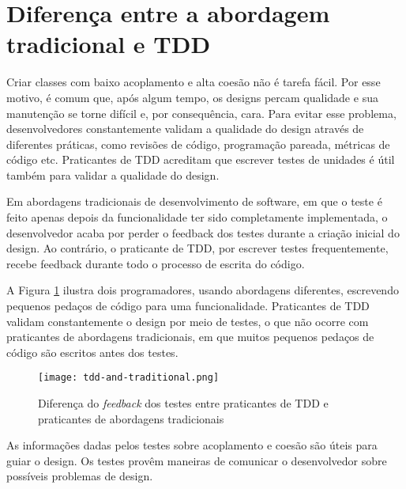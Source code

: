 \section{Diferença entre a abordagem tradicional e TDD}
\label{sec:diferencas-tdd-e-tradicional}


Criar classes com baixo acoplamento e alta coesão não é tarefa fácil. Por esse
motivo, é comum que, após algum tempo, os designs percam qualidade e sua
manutenção se torne difícil e, por consequência, cara.
Para evitar esse problema, desenvolvedores constantemente validam a qualidade do
design através de diferentes práticas, como revisões de código, programação
pareada, métricas de código etc. Praticantes de TDD acreditam que escrever
testes de unidades é útil também para validar a qualidade do design.

Em abordagens tradicionais de desenvolvimento de software, em que o teste é feito
apenas depois da funcionalidade ter sido completamente implementada, o
desenvolvedor acaba por perder o feedback dos testes durante a criação inicial
do design. Ao contrário, o praticante de TDD, por escrever testes
frequentemente, recebe feedback durante todo o processo de escrita do código.

A Figura \ref{fig:tdd-feedback} ilustra dois programadores, usando
abordagens diferentes, escrevendo pequenos pedaços de código para uma
funcionalidade. Praticantes de TDD validam constantemente o design por meio de
testes, o que não ocorre com praticantes de abordagens tradicionais, em que
muitos pequenos pedaços de código são escritos antes dos testes.

\begin{figure}[H]
  \centering
  \texttt{[image: tdd-and-traditional.png]}
  \caption{Diferença do \textit{feedback} dos testes entre praticantes de TDD e
  praticantes de abordagens tradicionais}
  \label{fig:tdd-feedback}
\end{figure}

As informações dadas pelos testes sobre acoplamento e coesão são úteis para
guiar o design. Os testes provêm maneiras de comunicar o desenvolvedor sobre
possíveis problemas de design. 
